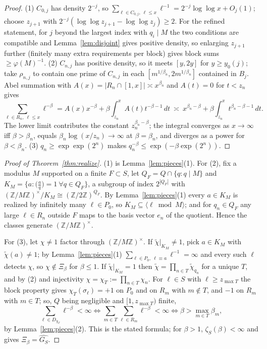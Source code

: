 \documentclass[11pt]{amsart}
\numberwithin{equation}{section}
\theoremstyle{definition}
\theoremstyle{remark}
\newcommand{\Z}{\mathbb{Z}}
\begin{document}
\begin{proof}
(1) $C_{0,j}$ has density $2^{-j}$, so
$\sum_{\ell\in C_{0,j},\ \ell\le x}\ell^{-1}=2^{-j}\log\log x+O_j(1)$; choose $z_{j+1}$ with
$2^{-j}(\log\log z_{j+1}-\log\log z_j)\ge2$. For the refined statement, for $j$ beyond the
largest index with $q_i\mid M$ the two conditions are compatible and
Lemma~\ref{lem:disjoint} gives positive density, so enlarging $z_{j+1}$ further (finitely
many extra requirements per block) gives block sums $\ge\varphi(M)^{-1}$.
(2) $C_{n,j}$ has positive density, so it meets $[y,2y]$ for $y\ge y_0(j)$; take
$\rho_{n,j}$ to contain one prime of $C_{n,j}$ in each $[m^{1/\beta_n},2m^{1/\beta_n}]$
contained in $B_j$. Abel summation with $A(x)=|R_n\cap[1,x]|\asymp x^{\beta_n}$ and $A(t)=0$ for $t<z_n$ gives
\[
\sum_{\ell\in R_n,\ \ell\le x}\ell^{-\beta}=A(x)x^{-\beta}+\beta\int_{z_n}^{x}A(t)t^{-\beta-1}\,dt
\ \asymp\ x^{\beta_n-\beta}+\beta\int_{z_n}^{x}t^{\beta_n-\beta-1}\,dt .
\]
The lower limit contributes the constant $z_n^{\beta_n-\beta}$; the integral converges as
$x\to\infty$ iff $\beta>\beta_n$, equals $\beta_n\log(x/z_n)\to\infty$ at $\beta=\beta_n$,
and diverges as a power for $\beta<\beta_n$.
(3) $q_n\ge\exp\exp(2^n)$ makes $q_n^{-\beta}\le\exp(-\beta\exp(2^n))$.
\end{proof}

\begin{proof}[Proof of Theorem~\ref{thm:realize}]
(1) is Lemma~\ref{lem:pieces}(1). For (2), fix a modulus $M$ supported on a finite
$F\subset S$, let $Q_F=Q\cap\{q:q\mid M\}$ and
$K_M=\{a:\bigl(\tfrac{a}{q}\bigr)=1\ \forall q\in Q_F\}$, a subgroup of index $2^{|Q_F|}$
with $(\Z/M\Z)^\times/K_M\cong(\Z/2\Z)^{Q_F}$. By Lemma~\ref{lem:pieces}(1) every $a\in K_M$
is realized by infinitely many $\ell\in P_0$, so $K_M\subseteq\langle\ell\bmod M\rangle$; and
for $q_n\in Q_F$ any large $\ell\in R_n$ outside $F$ maps to the basis vector $e_n$ of the
quotient. Hence the classes generate $(\Z/M\Z)^\times$.

For (3), let $\chi\ne1$ factor through $(\Z/M\Z)^\times$. If $\tilde\chi|_{K_M}\ne1$, pick
$a\in K_M$ with $\tilde\chi(a)\ne1$; by Lemma~\ref{lem:pieces}(1)
$\sum_{\ell\in P_0,\ \ell\equiv a}\ell^{-1}=\infty$ and every such $\ell$ detects $\chi$, so
$\chi\notin\Xi_\beta$ for $\beta\le1$. If $\tilde\chi|_{K_M}=1$ then
$\tilde\chi=\prod_{n\in T}\tilde\chi_{q_n}$ for a unique $T$, and by (2) and injectivity
$\chi=\chi_T:=\prod_{n\in T}\chi_n$. For $\ell\in S$ with $\ell\ge z_{\max T}$ the block
property gives $\chi_T(\sigma_\ell)=+1$ on $P_0$ and on $R_m$ with $m\notin T$, and $-1$ on
$R_m$ with $m\in T$; so, $Q$ being negligible and $[1,z_{\max T})$ finite,
\[
\sum_{\ell\in D_{\chi_T}}\ell^{-\beta}<\infty\iff\sum_{m\in T}\sum_{\ell\in R_m}\ell^{-\beta}<\infty
\iff\beta>\max_{m\in T}\beta_m,
\]
by Lemma~\ref{lem:pieces}(2). This is the stated formula; for $\beta>1$,
$\zeta_S(\beta)<\infty$ and \cite[Lem.~3.5]{Main} gives $\Xi_\beta=\widehat{G_S}$.
\end{proof}
\end{document}
